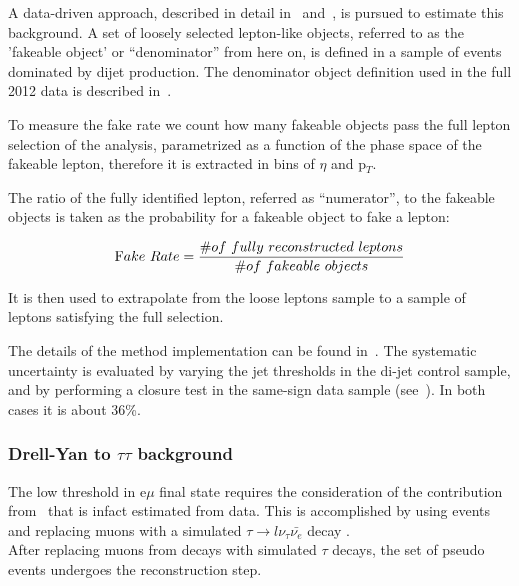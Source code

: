 A data-driven approach, described in detail in~\cite{AN-2010-261} and~\cite{AN-2010-397}, is pursued 
to estimate this background. A set of loosely selected lepton-like objects, referred to as the 
'fakeable object' or ``denominator'' from here on, is defined in a sample of events 
dominated by dijet production. The denominator object definition used in the full 2012
data is described in~\cite{AN-2012-378}.

To measure the fake rate we count how many fakeable objects pass the full lepton selection 
of the analysis, parametrized as a function of the phase space of the fakeable lepton, therefore 
it is extracted in bins of $\eta$ and p$_T$.


The ratio of the fully identified lepton, referred as ``numerator'', to the 
fakeable objects is taken as the probability for a fakeable object to fake a lepton:

\begin{equation} 
{\mbox Fake\ Rate } = \frac{\# of \ fully \ reconstructed \ leptons}{\# of \ fakeable \ objects} 
\end{equation}

It is then used to extrapolate from the loose leptons sample to a sample of leptons satisfying the  
full selection. 

The details of the method implementation can be found in~\cite{AN-2013-022}.
The systematic uncertainty is evaluated by varying the jet thresholds in the di-jet control sample, and by
performing a closure test in the same-sign data sample (see~\cite{AN-2013-022}). In both cases it is about 36\%.

	\subsubsection{Drell-Yan to \texorpdfstring{$\tau\tau$}{tau tau} background\label{sec:DYtautaubkg}}


The low \MET threshold in e$\mu$ final state
requires the consideration of the contribution from 
\dytt\, that is infact estimated from data.
This is accomplished by using 
\dymm events and replacing muons with a simulated
$\tau\to l\nu_\tau\bar{\nu_e}$ decay \cite{AN-2011-020}.\\
After replacing muons from \dymm decays with simulated $\tau$ decays,
the set of pseudo \dytt events undergoes the reconstruction step.
 
